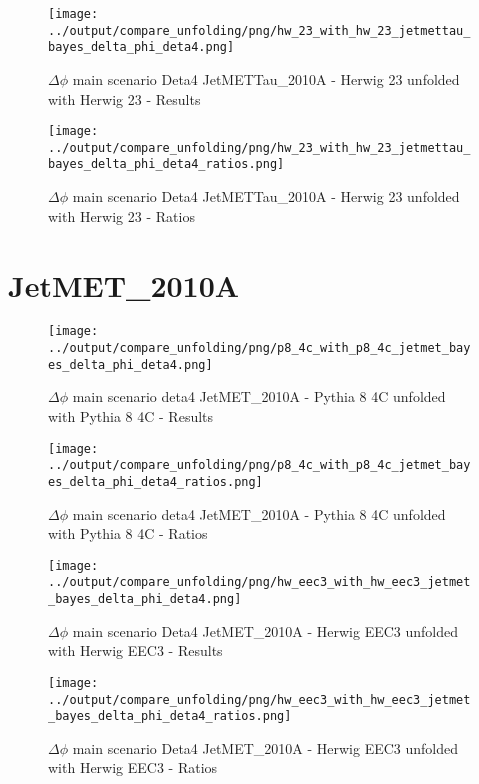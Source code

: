 \documentclass[11pt]{book}
\begin{document}
\begin{figure}[ht]
\centering
\texttt{[image: ../output/compare\_unfolding/png/hw\_23\_with\_hw\_23\_jetmettau\_bayes\_delta\_phi\_deta4.png]}
\caption{$\Delta\phi$ main scenario Deta4 JetMETTau\_2010A - Herwig 23 unfolded with Herwig 23 - Results}
\label{hw_23_hw_23_jetmettau_bayes_delta_phi_deta4_a}
\end{figure}

\begin{figure}[ht]
\centering
\texttt{[image: ../output/compare\_unfolding/png/hw\_23\_with\_hw\_23\_jetmettau\_bayes\_delta\_phi\_deta4\_ratios.png]}
\caption{$\Delta\phi$ main scenario Deta4 JetMETTau\_2010A - Herwig 23 unfolded with Herwig 23 - Ratios}
\label{hw_23_hw_23_jetmettau_bayes_delta_phi_deta4_b}
\end{figure}

\clearpage
\section{JetMET\_2010A}


\begin{figure}[ht]
\centering
\texttt{[image: ../output/compare\_unfolding/png/p8\_4c\_with\_p8\_4c\_jetmet\_bayes\_delta\_phi\_deta4.png]}
\caption{$\Delta\phi$ main scenario deta4 JetMET\_2010A - Pythia 8 4C unfolded with Pythia 8 4C - Results}
\label{p8_p8_jetmet_bayes_delta_phi_deta4_a}
\end{figure}

\begin{figure}[ht]
\centering
\texttt{[image: ../output/compare\_unfolding/png/p8\_4c\_with\_p8\_4c\_jetmet\_bayes\_delta\_phi\_deta4\_ratios.png]}
\caption{$\Delta\phi$ main scenario deta4 JetMET\_2010A - Pythia 8 4C unfolded with Pythia 8 4C - Ratios}
\label{p8_p8_jetmet_bayes_delta_phi_deta4_b}
\end{figure}

\begin{figure}[ht]
\centering
\texttt{[image: ../output/compare\_unfolding/png/hw\_eec3\_with\_hw\_eec3\_jetmet\_bayes\_delta\_phi\_deta4.png]}
\caption{$\Delta\phi$ main scenario Deta4 JetMET\_2010A - Herwig EEC3 unfolded with Herwig EEC3 - Results}
\label{hw_eec3_hw_eec3_jetmet_bayes_delta_phi_deta4_a}
\end{figure}

\begin{figure}[ht]
\centering
\texttt{[image: ../output/compare\_unfolding/png/hw\_eec3\_with\_hw\_eec3\_jetmet\_bayes\_delta\_phi\_deta4\_ratios.png]}
\caption{$\Delta\phi$ main scenario Deta4 JetMET\_2010A - Herwig EEC3 unfolded with Herwig EEC3 - Ratios}
\label{hw_eec3_hw_eec3_jetmet_bayes_delta_phi_deta4_b}
\end{figure}
\end{document}
